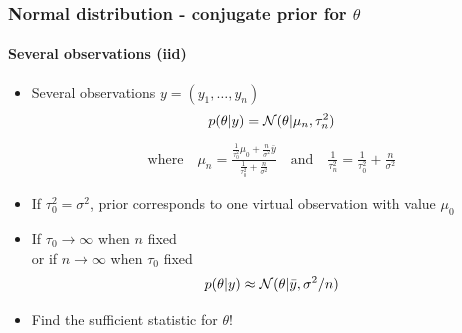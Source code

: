 \documentclass[10pt]{beamer}
\begin{document}
\begin{frame}

\frametitle{Normal distribution - conjugate prior for $\theta$}
\framesubtitle{Several observations (iid)}

  \begin{itemize}
  \item Several observations $y=(y_1,\ldots,y_n)$
    \begin{align*}
      p(\theta|y) = \mathcal{N}(\theta|\mu_n,\tau_n^2)
    \end{align*}
    \vskip -6mm
    \begin{align*}
      \text{where} \quad
      \mu_n=\frac{\frac{1}{\tau_0^2}\mu_0+\frac{n}{\sigma^2}\bar{y}}{\frac{1}{\tau_0^2}+\frac{n}{\sigma^2}} \quad
      \text{and} \quad \frac{1}{\tau_n^2} = \frac{1}{\tau_0^2}+\frac{n}{\sigma^2}
    \end{align*}
  \item If $\tau_0^2=\sigma^2$, prior corresponds to one virtual observation with value $\mu_0$
    \pause
    \item If $\tau_0\rightarrow\infty$ when $n$ fixed\\
      or if $n\rightarrow\infty$ when $\tau_0$ fixed
      \begin{equation*}
        p(\theta|y) \approx \mathcal{N}(\theta|\bar{y},\sigma^2/n)
      \end{equation*}
      \pause
      \item Find the {\color{uured}sufficient statistic} for $\theta$!
  \end{itemize}

\end{frame}
\end{document}
